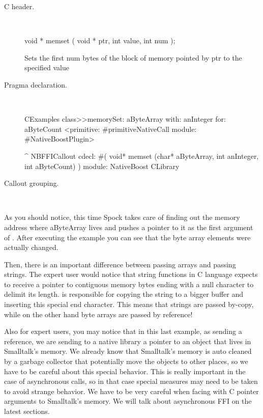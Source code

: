 \documentclass[a4paper,10pt,twoside]{book}
\begin{document}
\begin{description}
\item [C header.] \ 

\begin{code}{}
void * memset ( void * ptr, int value, int num );
\end{code}
Sets the first num bytes of the block of memory pointed by ptr to the specified value

\item [Pragma declaration.] \ 

\begin{code}{}
CExamples class>>memorySet: aByteArray with: anInteger for: aByteCount
	<primitive: #primitiveNativeCall module: #NativeBoostPlugin>
	
	^ NBFFICallout cdecl: #( void* memset (char* aByteArray, int anInteger, int aByteCount) ) module: NativeBoost CLibrary
\end{code}


\item [Callout grouping.] \ 
 

\end{description}

As you should notice, this time Spock takes care of finding out the memory address where aByteArray lives and pushes a pointer to it as the first argument of . After executing the example you can see that the byte array elements were actually changed. 

Then, there is an important difference between passing arrays and passing strings. The expert user would notice that string functions in C language expects to receive a pointer to contiguous memory bytes ending with a null character to delimit its length.  \Spock is responsible for copying the string to a bigger buffer and inserting this special end character. This means that strings are passed by-copy, while on the other hand byte arrays are passed by reference!

Also for expert users, you may notice that in this last example, as sending a reference, we are sending to a native library a pointer to an object that lives in Smalltalk's memory. We already know that Smalltalk's memory is auto cleaned by a garbage collector that potentially move the objects to other places, so we have to be careful about this special behavior. This is really important in the case of asynchronous calls, so in that case special measures may need to be taken to avoid strange behavior. We have to be very careful when facing with C pointer arguments to Smalltalk's memory. We will talk about asynchronous FFI on the latest sections.
\end{document}

